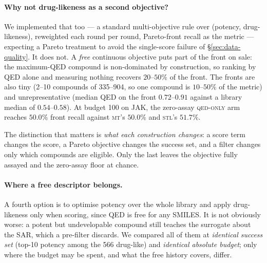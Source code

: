 \documentclass[11pt]{article}
\newcommand{\stl}{\textsc{stl}}
\newcommand{\mt}{\textsc{mt}}
\begin{document}
\paragraph{Why not drug-likeness as a second objective?} We implemented that
too --- a standard multi-objective rule over (potency, drug-likeness), reweighted each round
per round, Pareto-front recall as the metric --- expecting a Pareto treatment to
avoid the single-score failure of \S\ref{sec:data-quality}. It does not. A
\emph{free} continuous objective puts part of the front on sale: the maximum-QED
compound is non-dominated by construction, so ranking by QED alone and measuring
nothing recovers $20$--$50\%$ of the front. The fronts are also tiny (2--10
compounds of 335--904, so one compound is $10$--$50\%$ of the metric) and
unrepresentative (median QED on the front $0.72$--$0.91$ against a library
median of $0.54$--$0.58$). At budget 100 on JAK, the zero-assay \textsc{qed-only}
arm reaches $50.0\%$ front recall against \mt{}'s $50.0\%$ and \stl{}'s $51.7\%$.

The distinction that matters is \emph{what each construction changes}: a score
term changes the score, a Pareto objective changes the success set, and a filter
changes only which compounds are eligible. Only the last leaves the objective
fully assayed and the zero-assay floor at chance.

\paragraph{Where a free descriptor belongs.} A fourth option is to optimise
potency over the whole library and apply drug-likeness only when scoring, since
QED is free for any SMILES. It is not obviously worse: a potent but
undevelopable compound still teaches the surrogate about the SAR, which a
pre-filter discards. We compared all of them at \emph{identical success set}
(top-10 potency among the 566 drug-like) and \emph{identical absolute budget};
only where the budget may be spent, and what the free history covers, differ.
\end{document}
